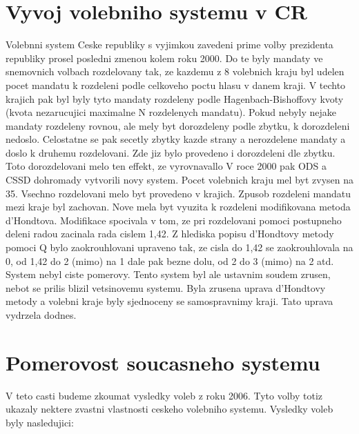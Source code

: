 \documentclass[12pt,a4paper]{report}
\begin{document}
\section{Vyvoj volebniho systemu v CR}
Volebnni system Ceske republiky s vyjimkou zavedeni prime volby prezidenta republiky prosel posledni zmenou kolem roku 2000.
Do te byly mandaty ve snemovnich volbach rozdelovany tak, ze kazdemu z 8 volebnich kraju byl udelen pocet mandatu k rozdeleni podle celkoveho poctu hlasu v danem kraji.
V techto krajich pak byl byly tyto mandaty rozdeleny podle Hagenbach-Bishoffovy kvoty (kvota nezarucujici maximalne N rozdelenych mandatu).
Pokud nebyly nejake mandaty rozdeleny rovnou, ale mely byt dorozdeleny podle zbytku, k dorozdeleni nedoslo.
Celostatne se pak secetly zbytky kazde strany a nerozdelene mandaty a doslo k druhemu rozdelovani.
Zde jiz bylo provedeno i dorozdeleni dle zbytku.
Toto dorozdelovani melo ten effekt, ze vyrovnavallo %
V roce 2000 pak ODS a CSSD dohromady vytvorili novy system.
Pocet volebnich kraju mel byt zvysen na 35.
Vsechno rozdelovani melo byt provedeno v krajich.
Zpusob rozdeleni mandatu mezi kraje byl zachovan.
Nove mela byt vyuzita k rozdeleni modifikovana metoda d'Hondtova.
Modifikace spocivala v tom, ze pri rozdelovani pomoci postupneho deleni radou zacinala rada cislem 1,42.
Z hlediska popisu d'Hondtovy metody pomoci Q bylo zaokrouhlovani upraveno tak, ze cisla do 1,42 se zaokrouhlovala na 0, od 1,42 do 2 (mimo) na 1 dale pak bezne dolu, od 2 do 3 (mimo) na 2 atd.
System nebyl ciste pomerovy.
Tento system byl ale ustavnim soudem zrusen, nebot se prilis blizil vetsinovemu systemu. \autocite{SOU}
Byla zrusena uprava d'Hondtovy metody a volebni kraje byly sjednoceny se samospravnimy kraji.
Tato uprava vydrzela dodnes.

\section{Pomerovost soucasneho systemu}
V teto casti budeme zkoumat vysledky voleb z roku 2006. 
Tyto volby totiz ukazaly nektere zvastni vlastnosti ceskeho volebniho systemu.
Vysledky voleb byly nasledujici:
\end{document}
